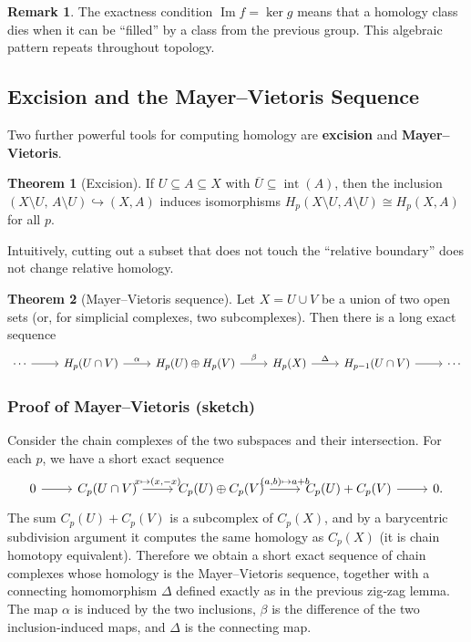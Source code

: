 \documentclass{article}
\theoremstyle{definition}
\newtheorem{remark}{Remark}[section]
\newtheorem{theorem}{Theorem}[section]
\begin{document}
\begin{remark}
The exactness condition $\operatorname{Im} f = \ker g$ means that a homology class dies when it can be “filled” by a class from the previous group. This algebraic pattern repeats throughout topology.
\end{remark}

\subsection{Excision and the Mayer–Vietoris Sequence}
Two further powerful tools for computing homology are \textbf{excision} and \textbf{Mayer–Vietoris}.

\begin{theorem}[Excision]
If $U \subseteq A \subseteq X$ with $\overline{U} \subseteq \operatorname{int}(A)$, then the inclusion $(X\setminus U,\, A\setminus U) \hookrightarrow (X,A)$ induces isomorphisms $H_p(X\setminus U, A\setminus U) \cong H_p(X,A)$ for all $p$.
\end{theorem}
Intuitively, cutting out a subset that does not touch the “relative boundary” does not change relative homology.

\begin{theorem}[Mayer–Vietoris sequence]
Let $X = U \cup V$ be a union of two open sets (or, for simplicial complexes, two subcomplexes). Then there is a long exact sequence
\[
\begin{tikzcd}
\cdots \arrow[r] & H_p(U\cap V) \arrow[r, "\alpha"] & H_p(U)\oplus H_p(V) \arrow[r, "\beta"] & H_p(X) \arrow[r, "\Delta"] & H_{p-1}(U\cap V) \arrow[r] & \cdots
\end{tikzcd}
\]
\end{theorem}

\subsubsection*{Proof of Mayer–Vietoris (sketch)}
Consider the chain complexes of the two subspaces and their intersection. For each $p$, we have a short exact sequence
\[
\begin{tikzcd}
0 \arrow[r] & C_p(U\cap V) \arrow[r, "{x\mapsto (x,-x)}"] & C_p(U)\oplus C_p(V) \arrow[r, "{(a,b)\mapsto a+b}"] & C_p(U)+C_p(V) \arrow[r] & 0.
\end{tikzcd}
\]
The sum $C_p(U)+C_p(V)$ is a subcomplex of $C_p(X)$, and by a barycentric subdivision argument it computes the same homology as $C_p(X)$ (it is chain homotopy equivalent). Therefore we obtain a short exact sequence of chain complexes whose homology is the Mayer–Vietoris sequence, together with a connecting homomorphism $\Delta$ defined exactly as in the previous zig‑zag lemma. The map $\alpha$ is induced by the two inclusions, $\beta$ is the difference of the two inclusion‑induced maps, and $\Delta$ is the connecting map.
\end{document}
